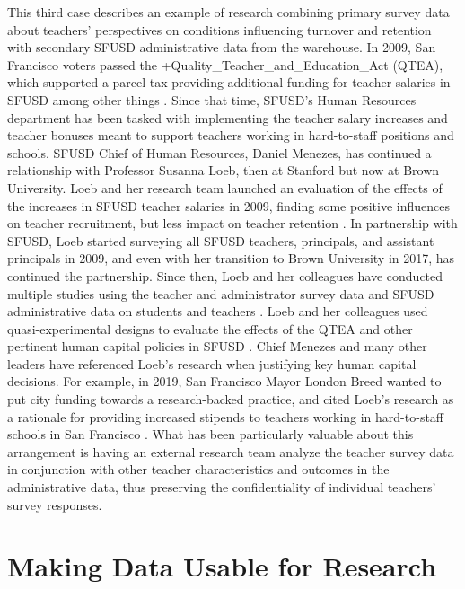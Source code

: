 \documentclass[
]{book}
\begin{document}
This third case describes an example of research combining primary survey data about teachers' perspectives on conditions influencing turnover and retention with secondary SFUSD administrative data from the warehouse. In 2009, San Francisco voters passed the +Quality\_Teacher\_and\_Education\_Act\textbar{} (QTEA), which supported a parcel tax providing additional funding for teacher salaries in SFUSD among other things \citep{hough2009}. Since that time, SFUSD's Human Resources department has been tasked with implementing the teacher salary increases and teacher bonuses meant to support teachers working in hard-to-staff positions and schools. SFUSD Chief of Human Resources, Daniel Menezes, has continued a relationship with Professor Susanna Loeb, then at Stanford but now at Brown University. Loeb and her research team launched an evaluation of the effects of the increases in SFUSD teacher salaries in 2009, finding some positive influences on teacher recruitment, but less impact on teacher retention \citep{hough2013}. In partnership with SFUSD, Loeb started surveying all SFUSD teachers, principals, and assistant principals in 2009, and even with her transition to Brown University in 2017, has continued the partnership. Since then, Loeb and her colleagues have conducted multiple studies using the teacher and administrator survey data and SFUSD administrative data on students and teachers \citep{dizon-ross2019}. Loeb and her colleagues used quasi-experimental designs to evaluate the effects of the QTEA and other pertinent human capital policies in SFUSD \citep{sun2017}. Chief Menezes and many other leaders have referenced Loeb's research when justifying key human capital decisions. For example, in 2019, San Francisco Mayor London Breed wanted to put city funding towards a research-backed practice, and cited Loeb's research as a rationale for providing increased stipends to teachers working in hard-to-staff schools in San Francisco \citep{waxmann2019}. What has been particularly valuable about this arrangement is having an external research team analyze the teacher survey data in conjunction with other teacher characteristics and outcomes in the administrative data, thus preserving the confidentiality of individual teachers' survey responses.

\hypertarget{making-data-usable-for-research-4}{%
\section{Making Data Usable for Research}\label{making-data-usable-for-research-4}}
\end{document}
